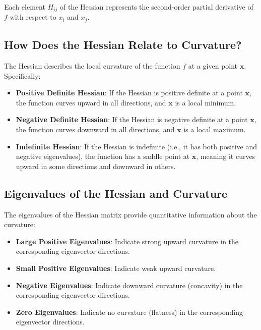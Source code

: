 \begin{notechapter}
Each element \( H_{ij} \) of the Hessian represents the 
second-order partial derivative of \( f \) with respect to 
\( x_i \) and \( x_j \).

\subsection{How Does the Hessian Relate to Curvature?}
The Hessian describes the local curvature of the function 
\( f \) at a given point \( \mathbf{x} \). Specifically:
\begin{itemize}
    \item \textbf{Positive Definite Hessian}: If the Hessian 
          is positive definite at a point \( \mathbf{x} \), 
          the function curves upward in all directions, and 
          \( \mathbf{x} \) is a local minimum.
    \item \textbf{Negative Definite Hessian}: If the Hessian 
          is negative definite at a point \( \mathbf{x} \), 
          the function curves downward in all directions, and 
          \( \mathbf{x} \) is a local maximum.
    \item \textbf{Indefinite Hessian}: If the Hessian is 
          indefinite (i.e., it has both positive and negative 
          eigenvalues), the function has a saddle point at 
          \( \mathbf{x} \), meaning it curves upward in some 
          directions and downward in others.
\end{itemize}

\subsection{Eigenvalues of the Hessian and Curvature}
The eigenvalues of the Hessian matrix provide quantitative 
information about the curvature:
\begin{itemize}
    \item \textbf{Large Positive Eigenvalues}: Indicate strong 
          upward curvature in the corresponding eigenvector 
          directions.
    \item \textbf{Small Positive Eigenvalues}: Indicate weak 
          upward curvature.
    \item \textbf{Negative Eigenvalues}: Indicate downward 
          curvature (concavity) in the corresponding eigenvector 
          directions.
    \item \textbf{Zero Eigenvalues}: Indicate no curvature 
          (flatness) in the corresponding eigenvector directions.
\end{itemize}


\end{notechapter}

